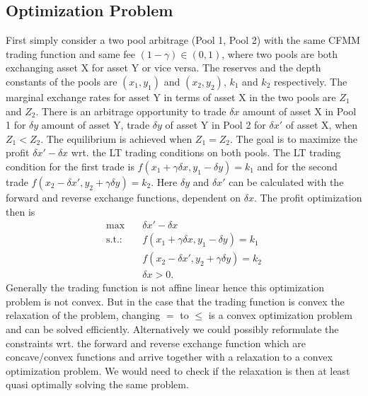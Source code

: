 \subsection{Optimization Problem}
First simply consider a two pool arbitrage (Pool 1, Pool 2) with the same
CFMM trading function and same fee $(1-\gamma)\in (0,1)$, where two pools are
both exchanging asset X for asset Y or vice versa. The reserves and the depth
constants of the pools are $(x_1, y_1)$ and $(x_2, y_2)$, $k_1$ and $k_2$
respectively. The marginal exchange rates for asset Y in terms of asset X in
the two pools are $Z_1$ and $Z_2$. There is an arbitrage opportunity to trade
$\delta x$ amount of asset X in Pool 1 for $\delta y$ amount of asset Y,
trade $\delta y$ of asset Y in Pool 2 for $\delta x'$ of asset X, when $Z_1 <
Z_2$. The equilibrium is achieved when $Z_1 = Z_2$. The goal is to maximize
the profit $\delta x' - \delta x$ wrt. the LT trading conditions on both
pools. The LT trading condition for the first trade is $f(x_1+\gamma \delta
x, y_1 - \delta y) = k_1$ and for the second trade $f(x_2 - \delta x',
y_2 + \gamma \delta y) = k_2$. Here $\delta y$ and $\delta x'$ can be calculated with the
forward and reverse exchange functions, dependent on $\delta x$. The profit
optimization then is
\begin{align}
    \max \quad &\delta x' - \delta x \\
    \text{s.t.:}\quad &f(x_1+\gamma \delta x, y_1 - \delta y) = k_1\\
             &f(x_2 - \delta x', y_2 + \gamma \delta y) = k_2\\
             &\delta x > 0.
\end{align}
Generally the trading function is not affine linear hence this optimization
problem is not convex. But in the case that the trading function is convex
the relaxation of the problem, changing $=$ to $\le$ is a convex optimization
problem and can be solved efficiently. Alternatively we could possibly
reformulate the constraints wrt. the forward and reverse exchange function
which are concave/convex functions and arrive together with a relaxation to a
convex optimization problem. We would need to check if the relaxation is then
at least quasi optimally solving the same problem.

